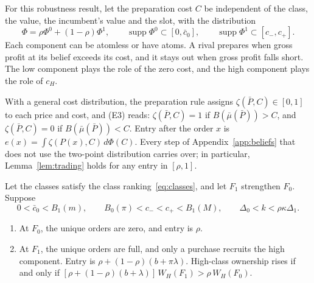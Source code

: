 For this robustness result, let the preparation cost \(C\) be independent of
the class, the value, the incumbent's value and the slot, with the distribution
\[
\Phi=\rho \Phi^0+(1-\rho)\Phi^1,\qquad \operatorname{supp}\Phi^0\subset[0,\bar c_0],\qquad \operatorname{supp}\Phi^1\subset[c_-,c_+].
\]
Each component can be atomless or have atoms. A rival prepares when gross profit at its belief exceeds its
cost, and it stays out when gross profit falls short. The low component plays the role of the zero cost, and the high
component plays the role of \(c_H\).

With a general cost distribution, the preparation rule assigns \(\zeta(\bar P,C)\in[0,1]\) to each price and cost, and (E3)
reads: \(\zeta(\bar P,C)=1\) if \(B(\bar\mu(\bar P))>C\), and \(\zeta(\bar P,C)=0\) if \(B(\bar\mu(\bar P))<C\). Entry
after the order \(x\) is \(e(x)=\int\zeta(P(x),C)\,d\Phi(C)\). Every step of Appendix~\ref{app:beliefs} that does not
use the two-point distribution carries over; in particular, Lemma~\ref{lem:trading} holds for any entry in \([\rho,1]\).

\begin{proposition}\label{prop:atomless}
Let the classes satisfy the class ranking~\eqref{eq:classes}, and let \(F_1\) strengthen \(F_0\). Suppose
\[
0<\bar c_0<B_1(m),\qquad B_0(\pi)<c_-<c_+<B_1(M),\qquad \Delta_0<k<\rho\kappa\Delta_1.
\]
\begin{enumerate}[label=(\roman*),leftmargin=2em]
\item At \(F_0\), the unique orders are zero, and entry is \(\rho\).
\item At \(F_1\), the unique orders are full, and only a purchase recruits the high component. Entry is
\(\rho+(1-\rho)(b+\pi\lambda)\). High-class ownership rises if and only if
\([\rho+(1-\rho)(b+\lambda)]\,W_H(F_1)>\rho\,W_H(F_0)\).
\end{enumerate}
\end{proposition}

